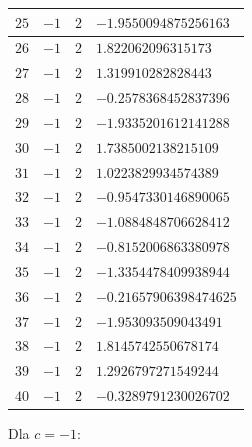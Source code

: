 \documentclass{article}
\begin{document}
\begin{center}
\begin{tabular}{|p{2cm}|p{2cm}|p{2cm}|p{}| }
		\hline
		$25$ & $-1$ & $2$ & $-1.9550094875256163$  \\ 
		\hline
		$26$ & $-1$ & $2$ & $1.822062096315173$  \\ 
		\hline
		$27$ & $-1$ & $2$ & $1.319910282828443$  \\ 
		\hline
		$28$ & $-1$ & $2$ & $-0.2578368452837396$  \\ 
		\hline
		$29$ & $-1$ & $2$ & $-1.9335201612141288$  \\ 
		\hline
		$30$ & $-1$ & $2$ & $1.7385002138215109$  \\ 
		\hline
		$31$ & $-1$ & $2$ & $1.0223829934574389$  \\ 
		\hline
		$32$ & $-1$ & $2$ & $-0.9547330146890065$  \\ 
		\hline
		$33$ & $-1$ & $2$ & $-1.0884848706628412$  \\ 
		\hline
		$34$ & $-1$ & $2$ & $-0.8152006863380978$  \\ 
		\hline
		$35$ & $-1$ & $2$ & $-1.3354478409938944$  \\ 
		\hline
		$36$ & $-1$ & $2$ & $-0.21657906398474625$  \\ 
		\hline
		$37$ & $-1$ & $2$ & $-1.953093509043491$  \\ 
		\hline
		$38$ & $-1$ & $2$ & $1.8145742550678174$  \\ 
		\hline
		$39$ & $-1$ & $2$ & $1.2926797271549244$  \\ 
		\hline
		$40$ & $-1$ & $2$ & $-0.3289791230026702$  \\ 
		\hline
	\end{tabular}
\end{center}
\newpage
Dla $c = -1$:
\end{document}
